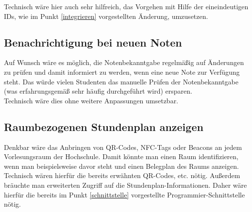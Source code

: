 \documentclass{article}
\begin{document}
Technisch wäre hier auch sehr hilfreich, das Vorgehen mit Hilfe der eineindeutigen IDs, wie im Punkt \ref{integrieren} vorgestellten Änderung, umzusetzen.

\subsection{Benachrichtigung bei neuen Noten}
Auf Wunsch wäre es möglich, die Notenbekanntgabe regelmäßig auf Änderungen zu prüfen und damit informiert zu werden, wenn eine neue Note zur Verfügung steht. 
Das würde vielen Studenten das manuelle Prüfen der Notenbekanntgabe (was erfahrungsgemäß sehr häufig durchgeführt wird) ersparen.\\
Technisch wäre dies ohne weitere Anpassungen umsetzbar.

\subsection{Raumbezogenen Stundenplan anzeigen}
Denkbar wäre das Anbringen von QR-Codes, NFC-Tags oder Beacons an jedem Vorlesungsraum der Hochschule. 
Damit könnte man einen Raum identifizieren, wenn man beispielsweise davor steht und einen Belegplan des Raums anzeigen.\\

Technisch wären hierfür die bereits erwähnten QR-Codes, etc. nötig. Außerdem bräuchte man erweiterten Zugriff auf die 
Stundenplan-Informationen. Daher wäre hierfür die bereits im Punkt \ref{schnittstelle} vorgestellte Programmier-Schnittstelle nötig.

\newpage
\end{document}
